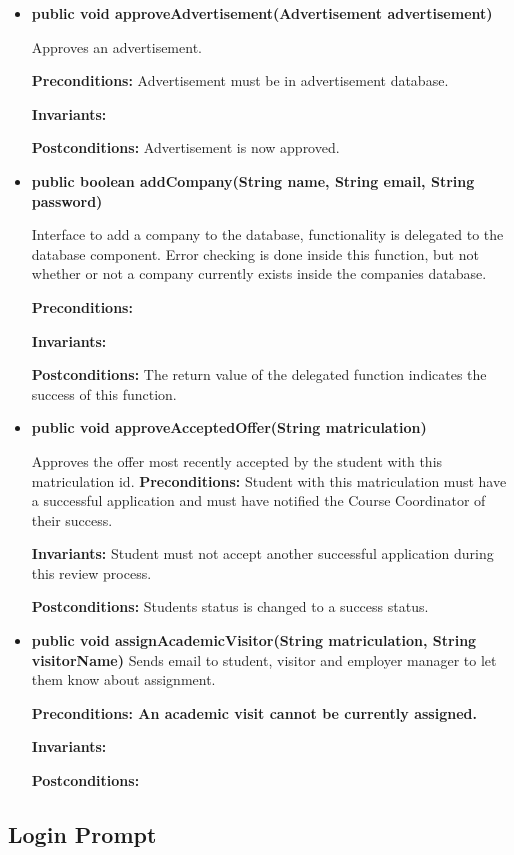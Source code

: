 \documentclass[11pt]{article}
\begin{document}
\begin{itemize}

\item{\textbf{public void approveAdvertisement(Advertisement advertisement)}

Approves an advertisement.

\textbf{Preconditions:} Advertisement must be in advertisement database.

\textbf{Invariants:}

\textbf{Postconditions:} Advertisement is now approved.}

\item{\textbf{public boolean addCompany(String name, String email, String
    password)} 

Interface to add a company to the database, functionality is delegated to the
database component.
Error checking is done inside this function, but not whether or not a company
currently exists inside the companies database.

\textbf{Preconditions:} 

\textbf{Invariants:}

\textbf{Postconditions:} The return value of the delegated function indicates
the success of this function.}

\item{\textbf{public void approveAcceptedOffer(String matriculation)}

Approves the offer most recently accepted by the student with this matriculation
id. 
\textbf{Preconditions:} Student with this matriculation must have a successful
application and must have notified the Course Coordinator of their success.

\textbf{Invariants:} Student must not accept another successful application
during this review process.

\textbf{Postconditions:} Students status is changed to a success status.}

\item{\textbf{public void assignAcademicVisitor(String matriculation, String
    visitorName)}
Sends email to student, visitor and employer manager to let them know about
assignment. 

\textbf{Preconditions: An academic visit cannot be currently assigned.}

\textbf{Invariants:} 

\textbf{Postconditions:} }

\end{itemize}
\subsection{Login Prompt}
\end{document}
